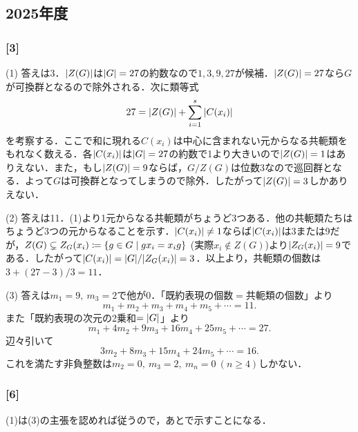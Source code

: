 \documentclass[a4j]{ltjsarticle}
\newcommand{\1}{\mathbbm{1}}
\numberwithin{equation}{section}
\theoremstyle{definition}
\begin{document}
\subsection{2025年度}
\subsubsection*{[3]}
(1) 答えは3．$\abs{Z(G)}$は$\abs{G}=27$の約数なので$1,3,9,27$が候補．$\abs{Z(G)}=27$なら$G$が可換群となるので除外される．次に類等式
\begin{equation}
    27=\abs{Z(G)}+\sum_{i=1}^{s}\abs{C(x_i)}    
\end{equation}
を考察する．ここで和に現れる$C(x_i)$は中心に含まれない元からなる共軛類をもれなく数える．各$\abs{C(x_i)}$は$\abs{G}=27$の約数で1より大きいので$\abs{Z(G)}=1$はありえない．また，もし$\abs{Z(G)}=9$ならば，$G/Z(G)$は位数3なので巡回群となる．よって$G$は可換群となってしまうので除外．したがって$\abs{Z(G)}=3$しかありえない．

(2) 答えは11．(1)より1元からなる共軛類がちょうど3つある．他の共軛類たちはちょうど3つの元からなることを示す．$\abs{C(x_i)}\neq1$ならば$\abs{C(x_i)}$は3または9だが，$Z(G)\subsetneq Z_G(x_i)\coloneq\qty{g\in G\mid gx_i=x_ig}$ (実際$x_i\notin Z(G)$)より$\abs{Z_G(x_i)}=9$である．したがって$\abs{C(x_i)}=\abs{G}/\abs{Z_G(x_i)}=3$．以上より，共軛類の個数は$3+(27-3)/3=11$．

(3) 答えは$m_1=9,\ m_3=2$で他が0．「既約表現の個数$=$共軛類の個数」より
\begin{equation}
    m_1+m_2+m_3+m_4+m_5+\cdots=11.
\end{equation}
また「既約表現の次元の2乗和$=\abs{G}$」より
\begin{equation}
    m_1+4m_2+9m_3+16m_4+25m_5+\cdots=27.
\end{equation}
辺々引いて
\begin{equation}
    3m_2+8m_3+15m_4+24m_5+\cdots=16.
\end{equation}
これを満たす非負整数は$m_2=0,\ m_3=2,\ m_n=0\ (n\geq4)$しかない．
\subsubsection*{[6]}
(1)は(3)の主張を認めれば従うので，あとで示すことになる．
\end{document}
